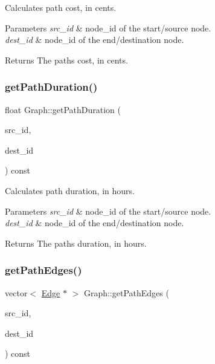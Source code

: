 Calculates path cost, in cents.


\begin{DoxyParams}{Parameters}
{\em src\+\_\+id} & node\+\_\+id of the start/source node. \\
\hline
{\em dest\+\_\+id} & node\+\_\+id of the end/destination node.\\
\hline
\end{DoxyParams}
\begin{DoxyReturn}{Returns}
The path\textquotesingle{}s cost, in cents. 
\end{DoxyReturn}
\hypertarget{class_graph_a2d69a99fb35fee10aadc243c468ad9b2}{}\label{class_graph_a2d69a99fb35fee10aadc243c468ad9b2} 
\subsubsection{\texorpdfstring{get\+Path\+Duration()}{getPathDuration()}}
{\footnotesize\ttfamily float Graph\+::get\+Path\+Duration (\begin{DoxyParamCaption}\item[{node\+\_\+id}]{src\+\_\+id,  }\item[{node\+\_\+id}]{dest\+\_\+id }\end{DoxyParamCaption}) const}

Calculates path duration, in hours.


\begin{DoxyParams}{Parameters}
{\em src\+\_\+id} & node\+\_\+id of the start/source node. \\
\hline
{\em dest\+\_\+id} & node\+\_\+id of the end/destination node.\\
\hline
\end{DoxyParams}
\begin{DoxyReturn}{Returns}
The path\textquotesingle{}s duration, in hours. 
\end{DoxyReturn}
\hypertarget{class_graph_a94db80dbb52cac57e2b5d14c53e649e7}{}\label{class_graph_a94db80dbb52cac57e2b5d14c53e649e7} 
\subsubsection{\texorpdfstring{get\+Path\+Edges()}{getPathEdges()}}
{\footnotesize\ttfamily vector$<$ \hyperlink{class_edge}{Edge} $\ast$ $>$ Graph\+::get\+Path\+Edges (\begin{DoxyParamCaption}\item[{node\+\_\+id}]{src\+\_\+id,  }\item[{node\+\_\+id}]{dest\+\_\+id }\end{DoxyParamCaption}) const}

